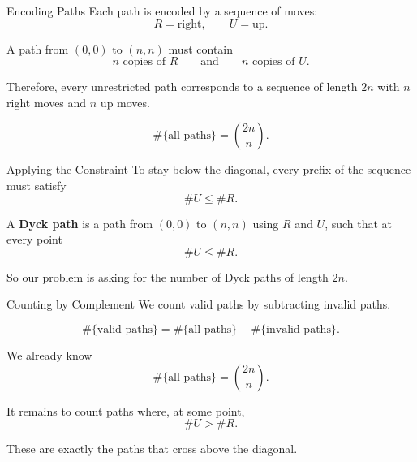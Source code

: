 \begin{frame}{Encoding Paths}
  Each path is encoded by a sequence of moves:
  \[
    R = \text{right},
    \qquad
    U = \text{up}.
  \]

  \vspace{0.5em}

  A path from \((0,0)\) to \((n,n)\) must contain
  \[
    n \text{ copies of } R
    \qquad \text{and} \qquad
    n \text{ copies of } U.
  \]

  \vspace{0.5em}

  Therefore, every unrestricted path corresponds to a sequence of length \(2n\)
  with \(n\) right moves and \(n\) up moves.

  \vspace{0.6em}

  \[
    \#\{\text{all paths}\}
    =
    \binom{2n}{n}.
  \]
\end{frame}


\begin{frame}{Applying the Constraint}
  To stay below the diagonal, every prefix of the sequence must satisfy
  \[
    \#U \le \#R.
  \]

  \vspace{0.6em}

  \begin{sqt:definition}
    A \textbf{Dyck path} is a path from \((0,0)\) to \((n,n)\)
    using \(R\) and \(U\), such that at every point
    \[
      \#U \le \#R.
    \]
  \end{sqt:definition}

  \vspace{0.4em}

  So our problem is asking for the number of Dyck paths of length \(2n\).
\end{frame}


\begin{frame}{Counting by Complement}
  We count valid paths by subtracting invalid paths.

  \vspace{0.5em}

  \[
    \#\{\text{valid paths}\}
    =
    \#\{\text{all paths}\}
    -
    \#\{\text{invalid paths}\}.
  \]

  \vspace{0.8em}

  We already know
  \[
    \#\{\text{all paths}\}
    =
    \binom{2n}{n}.
  \]

  \vspace{0.8em}

  It remains to count paths where, at some point,
  \[
    \#U > \#R.
  \]

  These are exactly the paths that cross above the diagonal.
\end{frame}



